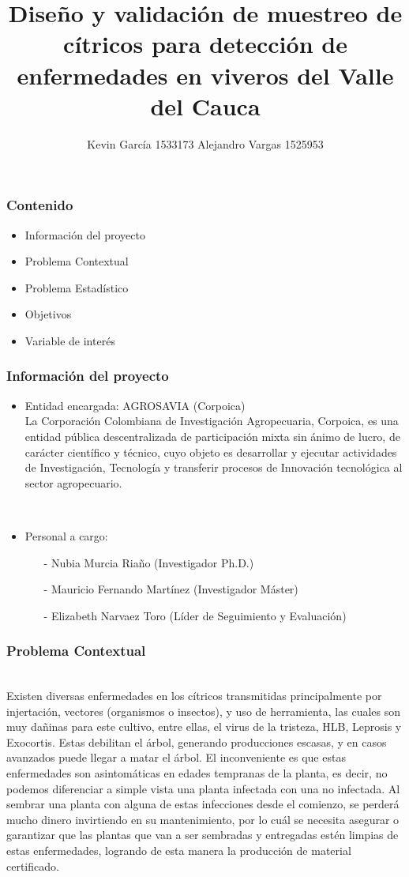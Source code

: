 \documentclass[11pt]{beamer}
\author[Kevin García - Alejandro Vargas]{Kevin García 1533173 \newline Alejandro Vargas 1525953}
\title[Anteproyecto]{Diseño y validación de muestreo de cítricos para detección de enfermedades en viveros del Valle del Cauca}
\begin{document}
\justify
\begin{frame}
\titlepage
\end{frame}


\begin{frame}
\frametitle{Contenido}
\begin{itemize}
\item Información del proyecto
\item Problema Contextual
\item Problema Estadístico
\item Objetivos
\item Variable de interés
\end{itemize}
\end{frame}

\begin{frame}
\frametitle{Información del proyecto}
\begin{itemize}
\item Entidad encargada: AGROSAVIA (Corpoica)
~\\La Corporación Colombiana de Investigación Agropecuaria, Corpoica, es una entidad pública descentralizada de participación mixta sin ánimo de lucro, de carácter científico y técnico, cuyo objeto es desarrollar y ejecutar actividades de Investigación, Tecnología y transferir procesos de Innovación tecnológica al sector agropecuario.

~\\
\item Personal a cargo:
\begin{itemize}
\item[-]Nubia Murcia Riaño (Investigador Ph.D.)
\item[-]Mauricio Fernando Martínez (Investigador Máster)
\item[-]Elizabeth Narvaez Toro (Líder de Seguimiento y Evaluación)
\end{itemize}
\end{itemize}
\end{frame}


\begin{frame}
\frametitle{Problema Contextual}
~\\Existen diversas enfermedades en los cítricos transmitidas principalmente por injertación, vectores (organismos o insectos), y uso de herramienta, las cuales son muy dañinas para este cultivo, entre ellas, el virus de la tristeza, HLB, Leprosis y Exocortis. Estas debilitan el árbol, generando producciones escasas, y en casos avanzados puede llegar a matar el árbol. El inconveniente es que estas enfermedades son asintomáticas en edades tempranas de la planta, es decir, no podemos diferenciar a simple vista una planta infectada con una no infectada. Al sembrar una planta con alguna de estas infecciones desde el comienzo, se perderá mucho dinero invirtiendo en su mantenimiento, por lo cuál se necesita asegurar o garantizar que las plantas que van a ser sembradas y entregadas estén limpias de estas enfermedades, logrando de esta manera la producción de material certificado.
\end{frame}
\end{document}

